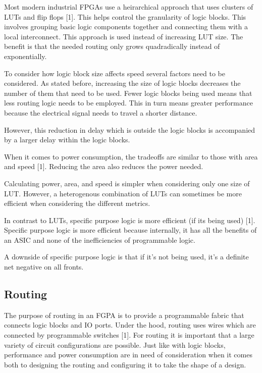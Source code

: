 \documentclass{article}
\begin{document}
    Most modern industrial FPGAs use a heirarchical approach that uses
    clusters of LUTs and flip flops [1]. This helps control the granularity
    of logic blocks.
    This involves grouping basic logic components together and connecting
    them with a local interconnect.
    This approach is used instead of increasing LUT size.
    The benefit is that the needed routing only grows quadradically instead
    of exponentially.

    To consider how logic block size affects speed several factors need to be considered.
    As stated before, increasing the size of logic blocks decreases the number of them
    that need to be used. Fewer logic blocks being used means that less routing
    logic needs to be employed. This in turn means greater performance
    because the electrical signal needs to travel a shorter distance.

    However, this reduction in delay which is outside the logic blocks is
    accompanied by a larger delay within the logic blocks.

    When it comes to power consumption, the tradeoffs are similar to those
    with area and speed [1]. Reducing the area also reduces the power needed.

    Calculating power, area, and speed is simpler when considering only
    one size of LUT. However, a heterogenous combination of LUTs can sometimes
    be more efficient when considering the different metrics.

    In contrast to LUTs, specific purpose logic is more efficient (if its being used) [1].
    Specific purpose logic is more efficient because internally, it
    has all the benefits of an ASIC and none of the inefficiencies of programmable logic.

    A downside of specific purpose logic is that if it's not being used, it's
    a definite net negative on all fronts.
    
    \subsection{Routing}

    The purpose of routing in an FGPA is to provide a programmable fabric that connects
    logic blocks and IO ports. Under the hood, routing uses wires which are connected
    by programmable switches [1]. For routing it is important that a large variety
    of circuit configurations are possible. Just like with logic blocks, performance
    and power consumption are in need of consideration when it comes both to designing
    the routing and configuring it to take the shape of a design.
\end{document}
